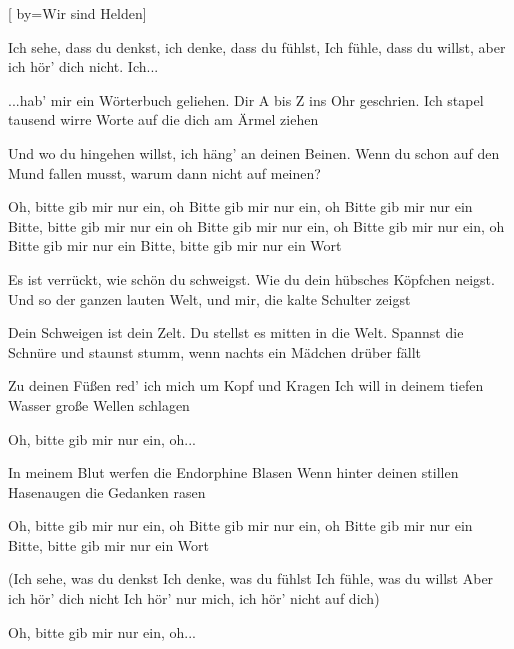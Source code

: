[
	by={Wir sind Helden}]

\beginverse
Ich sehe, dass du denkst, ich denke, dass du fühlst,
Ich fühle, dass du willst, aber ich hör' dich nicht. Ich...
\endverse

\beginverse
...hab' mir ein Wörterbuch geliehen. Dir A bis Z ins Ohr geschrien.
Ich stapel tausend wirre Worte auf die dich am Ärmel ziehen
\endverse

\beginverse
Und wo du hingehen willst, ich häng' an deinen Beinen.
Wenn du schon auf den Mund fallen musst, warum dann nicht auf meinen?
\endverse

\beginchorus
Oh, bitte gib mir nur ein, oh
Bitte gib mir nur ein, oh
Bitte gib mir nur ein
Bitte, bitte gib mir nur ein oh
Bitte gib mir nur ein, oh
Bitte gib mir nur ein, oh
Bitte gib mir nur ein
Bitte, bitte gib mir nur ein Wort
\endchorus

\beginverse
Es ist verrückt, wie schön du schweigst. Wie du dein hübsches Köpfchen neigst.
Und so der ganzen lauten Welt, und mir, die kalte Schulter zeigst
\endverse

\beginverse
Dein Schweigen ist dein Zelt. Du stellst es mitten in die Welt.
Spannst die Schnüre und staunst stumm, wenn nachts ein Mädchen drüber fällt
\endverse

\beginverse
Zu deinen Füßen red' ich mich um Kopf und Kragen
Ich will in deinem tiefen Wasser große Wellen schlagen
\endverse

\beginchorus
Oh, bitte gib mir nur ein, oh...
\endchorus

\beginverse
In meinem Blut werfen die Endorphine Blasen
Wenn hinter deinen stillen Hasenaugen die Gedanken rasen
\endverse

\beginverse
Oh, bitte gib mir nur ein, oh
Bitte gib mir nur ein, oh
Bitte gib mir nur ein
Bitte, bitte gib mir nur ein Wort
\endverse

\beginverse
(Ich sehe, was du denkst Ich denke, was du fühlst
Ich fühle, was du willst Aber ich hör' dich nicht
Ich hör' nur mich, ich hör' nicht auf dich)
\endverse

\beginchorus
Oh, bitte gib mir nur ein, oh...
\endchorus




\endsong

